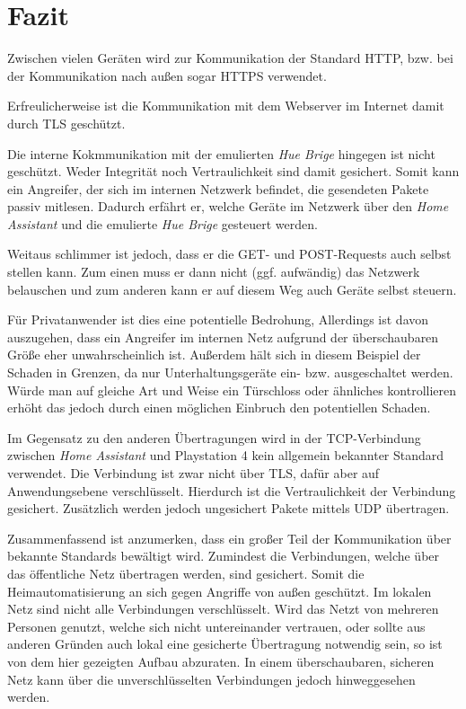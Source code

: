 \newpage

\section{Fazit}\label{sec:fazit}

Zwischen vielen Geräten wird zur Kommunikation der Standard HTTP,
bzw. bei der Kommunikation nach außen sogar HTTPS verwendet.

Erfreulicherweise ist die Kommunikation mit dem Webserver im Internet damit durch TLS geschützt.

Die interne Kokmmunikation mit der emulierten \textit{Hue Brige} hingegen ist nicht geschützt.
Weder Integrität noch Vertraulichkeit sind damit gesichert.
Somit kann ein Angreifer, der sich im internen Netzwerk befindet,
die gesendeten Pakete passiv mitlesen.
Dadurch erfährt er,
welche Geräte im Netzwerk über den \textit{Home Assistant} und die emulierte \textit{Hue Brige} gesteuert werden.

Weitaus schlimmer ist jedoch, dass er die GET- und POST-Requests auch selbst stellen kann.
Zum einen muss er dann nicht (ggf. aufwändig) das Netzwerk belauschen
und zum anderen kann er auf diesem Weg auch Geräte selbst steuern.

Für Privatanwender ist dies eine potentielle Bedrohung,
Allerdings ist davon auszugehen,
dass ein Angreifer im internen Netz aufgrund der überschaubaren Größe eher unwahrscheinlich ist.
Außerdem hält sich in diesem Beispiel der Schaden in Grenzen, da nur Unterhaltungsgeräte ein- bzw. ausgeschaltet werden.
Würde man auf gleiche Art und Weise ein Türschloss oder ähnliches kontrollieren erhöht das jedoch durch einen
möglichen Einbruch den potentiellen Schaden.

Im Gegensatz zu den anderen Übertragungen wird
in der TCP-Verbindung zwischen \textit{Home Assistant} und Playstation 4 kein allgemein bekannter Standard verwendet.
Die Verbindung ist zwar nicht über TLS, dafür aber auf Anwendungsebene verschlüsselt.
Hierdurch ist die Vertraulichkeit der Verbindung gesichert.
Zusätzlich werden jedoch ungesichert Pakete mittels UDP übertragen.

Zusammenfassend ist anzumerken,
dass ein großer Teil der Kommunikation über bekannte Standards bewältigt wird.
Zumindest die Verbindungen, welche über das öffentliche Netz übertragen werden, sind gesichert.
Somit die Heimautomatisierung an sich gegen Angriffe von außen geschützt.
Im lokalen Netz sind nicht alle Verbindungen verschlüsselt.
Wird das Netzt von mehreren Personen genutzt, welche sich nicht untereinander vertrauen,
oder sollte aus anderen Gründen auch lokal eine gesicherte Übertragung notwendig sein,
so ist von dem hier gezeigten Aufbau abzuraten.
In einem überschaubaren, sicheren Netz kann über die unverschlüsselten Verbindungen jedoch hinweggesehen werden.